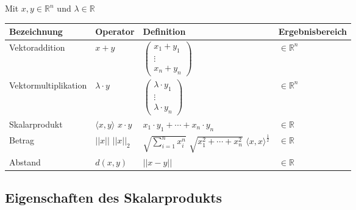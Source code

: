 \documentclass[pdftex,12pt,a4paper,fleqn]{scrartcl}
\begin{document}
Mit $x,y \in \mathbb{R}^n$ und $\lambda \in \mathbb{R}$

\begin{tabular}{|l|p{2.5cm}|p{5cm}|l|}
	\hline
	Bezeichnung & Operator & Definition & Ergebnisbereich\\
	\hline
	Vektoraddition & $x+y $&$
	\begin{pmatrix}
		x_1 + y_1\\
		\vdots\\
		x_n + y_n
	\end{pmatrix}$ & $\in \mathbb{R}^n$\\
	\hline
	Vektormultiplikation &  $ \lambda \cdot y $&$ 
	\begin{pmatrix}
		\lambda \cdot y_1\\
		\vdots\\
		\lambda \cdot y_n
	\end{pmatrix}$ & $\in \mathbb{R}^n$\\
	\hline
	Skalarprodukt & 
	$\langle x,y \rangle $ \newline
	$x \cdot y$
	&$ x_1 \cdot y_1 + \cdots + x_n \cdot y_n$
	& $\in \mathbb{R}$\\
	\hline
	Betrag &
	$ ||x|| $ \newline
	$ ||x||_2 $& 
	$ \sqrt{\sum_{i=1}^n x_i^n} $ \newline
	$ \sqrt{ x_1^2 + \cdots + x_n^2 } $ \newline
	$ \langle x,x \rangle^{ \frac{1}{2} }$
	& $\in \mathbb{R}$\\
	\hline
	Abstand & $d(x,y)$ & $||x-y||$ & $\in \mathbb{R}$\\
	\hline
\end{tabular}


\subsection{Eigenschaften des Skalarprodukts} %
\label{sub:eigenschaften_des_skalarprodukts}


\end{document}
